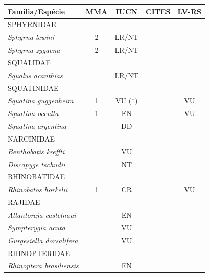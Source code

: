 \documentclass[a4paper,11pt,twoside,showtrims,onecolumn,openright,final]{memoir}
\begin{document}
\begin{table}
\begin{small}
\begin{tabular*}{\textwidth}{l@{\extracolsep{\fill}}cccc}
\toprule
Família/Espécie				& MMA	& IUCN	& CITES	& LV-RS \\
\midrule
\addlinespace
SPHYRNIDAE				& 	& 	& 	& 	\\
\emph{Sphyrna lewini}			& 2	& LR/NT	& 	& 	\\
\emph{Sphyrna zygaena}			& 2	& LR/NT	& 	& 	\\
\addlinespace
SQUALIDAE				& 	& 	& 	& 	\\
\emph{Squalus acanthias}		& 	& LR/NT	& 	& 	\\
\addlinespace
SQUATINIDAE				& 	& 	& 	& 	\\
\emph{Squatina guggenheim}		& 1	& VU (*)& 	& VU	\\
\emph{Squatina occulta}			& 1	& EN	& 	& VU	\\
\emph{Squatina argentina}		&	& DD	&	&	\\
\addlinespace
NARCINIDAE				& 	& 	& 	& 	\\
\emph{Benthobatis kreffti}		& 	& VU	& 	& 	\\
\emph{Discopyge tschudii}		& 	& NT	& 	& 	\\
\addlinespace
RHINOBATIDAE				& 	& 	& 	& 	\\
\emph{Rhinobatos horkelii}		& 1	& CR	& 	& VU	\\
\addlinespace
RAJIDAE					& 	& 	& 	& 	\\
\emph{Atlantoraja castelnaui}		& 	& EN	& 	& 	\\
\emph{Sympterygia acuta}		& 	& VU	& 	& 	\\
\emph{Gurgesiella dorsalifera} 		& 	& VU	& 	& 	\\
\addlinespace
RHINOPTERIDAE				& 	& 	& 	& 	\\
\emph{Rhinoptera brasiliensis} 		& 	& EN	& 	& 	\\
\bottomrule
\end{tabular*}
\end{small}
\end{table}
\end{document}
